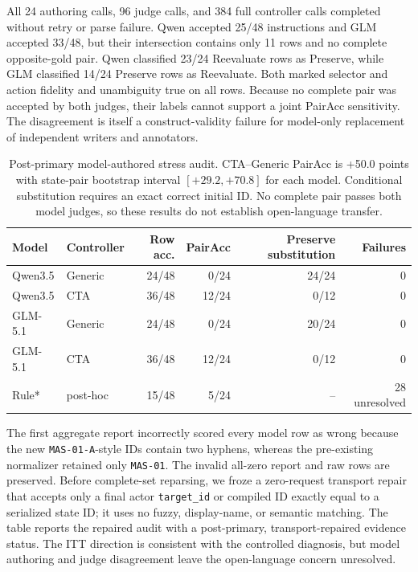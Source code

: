 \documentclass[10pt]{article}
\begin{document}
All 24 authoring calls, 96 judge calls, and 384 full controller calls completed without retry or
parse failure. Qwen accepted 25/48 instructions and GLM accepted 33/48, but their intersection
contains only 11 rows and no complete opposite-gold pair. Qwen classified 23/24 Reevaluate rows as
Preserve, while GLM classified 14/24 Preserve rows as Reevaluate. Both marked selector and action
fidelity and unambiguity true on all rows. Because no complete pair was accepted by both judges,
their labels cannot support a joint PairAcc sensitivity. The disagreement is itself a construct-validity failure for model-only replacement of independent
writers and annotators.

\begin{table}[H]
\centering
\small
\begin{tabular}{llrrrr}
\toprule
Model & Controller & Row acc. & PairAcc & Preserve substitution & Failures \\
\midrule
Qwen3.5 & Generic & 24/48 & 0/24 & 24/24 & 0 \\
Qwen3.5 & CTA & 36/48 & 12/24 & 0/12 & 0 \\
GLM-5.1 & Generic & 24/48 & 0/24 & 20/24 & 0 \\
GLM-5.1 & CTA & 36/48 & 12/24 & 0/12 & 0 \\
Rule* & post-hoc & 15/48 & 5/24 & -- & 28 unresolved \\
\bottomrule
\end{tabular}
\caption{Post-primary model-authored stress audit. CTA--Generic PairAcc is +50.0 points with
state-pair bootstrap interval $[+29.2,+70.8]$ for each model. Conditional substitution requires
an exact correct initial ID. No complete pair passes both model judges, so these results do not
establish open-language transfer.}
\end{table}

The first aggregate report incorrectly scored every model row as wrong because the new
\texttt{MAS-01-A}-style IDs contain two hyphens, whereas the pre-existing normalizer retained only
\texttt{MAS-01}. The invalid all-zero report and raw rows are preserved. Before complete-set
reparsing, we froze a zero-request transport repair that accepts only a final actor
\texttt{target\_id} or compiled ID exactly equal to a serialized state ID; it uses no fuzzy,
display-name, or semantic matching. The table reports the repaired audit with a post-primary,
transport-repaired evidence status. The ITT direction is consistent with the controlled diagnosis,
but model authoring and judge disagreement leave the open-language concern unresolved.
\end{document}
